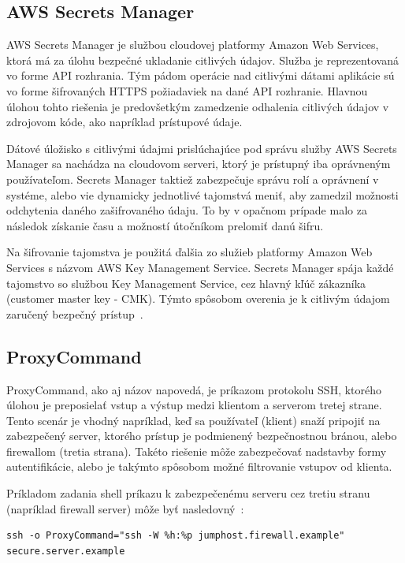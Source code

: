 \subsection{AWS Secrets Manager}\label{subsec:aws-secrets-manager}

AWS Secrets Manager je službou cloudovej platformy Amazon Web Services, ktorá má za úlohu bezpečné ukladanie citlivých údajov.
Služba je reprezentovaná vo forme API rozhrania.
Tým pádom operácie nad citlivými dátami aplikácie sú vo forme šifrovaných HTTPS požiadaviek na dané API rozhranie.
Hlavnou úlohou tohto riešenia je predovšetkým zamedzenie odhalenia citlivých údajov v zdrojovom kóde, ako napríklad prístupové údaje.

Dátové úložisko s citlivými údajmi prislúchajúce pod správu služby AWS Secrets Manager sa nachádza na cloudovom serveri, ktorý
je prístupný iba oprávneným používateľom.
Secrets Manager taktiež zabezpečuje správu rolí a oprávnení v systéme, alebo vie dynamicky jednotlivé tajomstvá meniť, aby
zamedzil možnosti odchytenia daného zašifrovaného údaju.
To by v opačnom prípade malo za následok získanie času a možností útočníkom prelomiť danú šifru.

Na šifrovanie tajomstva je použitá ďalšia zo služieb platformy Amazon Web Services s názvom AWS Key Management Service.
Secrets Manager spája každé tajomstvo so službou Key Management Service, cez hlavný kľúč zákazníka (customer master key - CMK).
Týmto spôsobom overenia je k citlivým údajom zaručený bezpečný prístup~\cite{SecretsManager}.

\subsection{ProxyCommand}\label{subsec:proxy-command}

ProxyCommand, ako aj názov napovedá, je príkazom protokolu SSH, ktorého úlohou je preposielať vstup a výstup medzi klientom
a serverom tretej strane.
Tento scenár je vhodný napríklad, keď sa používateľ (klient) snaží pripojiť na zabezpečený server, ktorého
prístup je podmienený bezpečnostnou bránou, alebo firewallom (tretia strana).
Takéto riešenie môže zabezpečovať nadstavby formy autentifikácie, alebo je takýmto spôsobom možné filtrovanie vstupov od klienta.

Príkladom zadania shell príkazu k zabezpečenému serveru cez tretiu stranu (napríklad firewall server) môže byť nasledovný~\cite{ProxyCommand}:

\begin{Verbatim}[frame=single]
ssh -o ProxyCommand="ssh -W %h:%p jumphost.firewall.example"
secure.server.example
\end{Verbatim}

